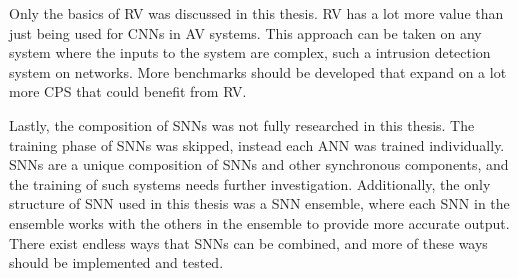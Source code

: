 Only the basics of \ac{RV} was discussed in this thesis.
\ac{RV} has a lot more value than just being used for \acp{CNN} in \ac{AV} systems.
This approach can be taken on any system where the inputs to the system are complex, such a intrusion detection system on networks. 
More benchmarks should be developed that expand on a lot more \ac{CPS} that could benefit from \ac{RV}.

Lastly, the composition of \acp{SNN} was not fully researched in this thesis.
The training phase of \acp{SNN} was skipped, instead each \ac{ANN} was trained individually.
\acp{SNN} are a unique composition of \acp{SNN} and other synchronous components, and the training of such systems needs further investigation.
Additionally, the only structure of \ac{SNN} used in this thesis was a \ac{SNN} ensemble, where each \ac{SNN} in the ensemble works with the others in the ensemble to provide more accurate output.
There exist endless ways that \acp{SNN} can be combined, and more of these ways should be implemented and tested.










